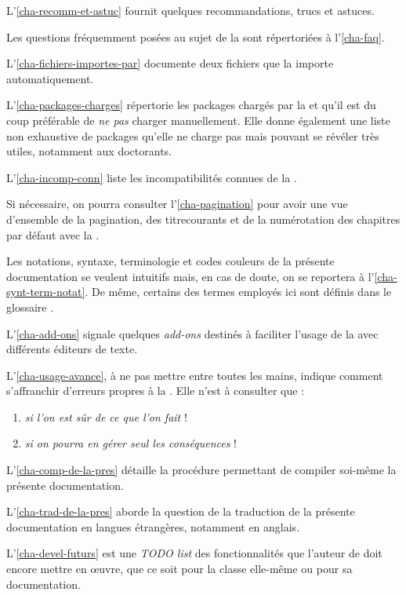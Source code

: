 L'\vref{cha-recomm-et-astuc} fournit quelques recommandations, trucs et astuces.

Les questions fréquemment posées au sujet de la \yatCl{} sont répertoriées
à l'\vref{cha-faq}.

L'\vref{cha-fichiers-importes-par} documente deux fichiers que la \yatCl{}
importe automatiquement.

L'\vref{cha-packages-charges} répertorie les packages chargés par la \yatCl{} et
qu'il est du coup préférable de \emph{ne pas} charger manuellement. Elle donne
également une liste non exhaustive de packages qu'elle ne charge pas mais
pouvant se révéler très utiles, notamment aux doctorants.

L'\vref{cha-incomp-conn} liste les incompatibilités connues de la \yatCl{}.

Si nécessaire, on pourra consulter l'\vref{cha-pagination} pour avoir une vue
d'ensemble de la \gls{pagination}, des \glspl{titrecourant} et de la
numérotation des chapitres par défaut avec la \yatCl{}.

Les notations, syntaxe, terminologie et codes couleurs de la présente
documentation se veulent intuitifs mais, en cas de doute, on se reportera
à l'\vref{cha-synt-term-notat}. De même, certains des termes employés ici sont
définis dans le glossaire .

L'\vref{cha-add-ons} signale quelques \emph{add-ons} destinés à faciliter
l'usage de la \yatCl{} avec différents éditeurs de texte.

L'\vref{cha-usage-avance}, à ne pas mettre entre toutes les mains, indique
comment s'affranchir d'erreurs propres à la \yatCl{}. Elle n'est
à consulter que :
\begin{enumerate}
\item \emph{si l'on est sûr de ce que l'on fait} !
\item \emph{si on pourra en gérer \emph{seul} les conséquences} !
\end{enumerate}

L'\vref{cha-comp-de-la-pres} détaille la procédure permettant de compiler
soi-même la présente documentation.

L'\vref{cha-trad-de-la-pres} aborde la question de la traduction de la présente
documentation en langues étrangères, notamment en anglais.

L'\vref{cha-devel-futurs} est une \emph{TODO list} des fonctionnalités que
l'auteur de \yatcl{} doit encore mettre en œuvre, que ce soit pour la classe
elle-même ou pour sa documentation.

